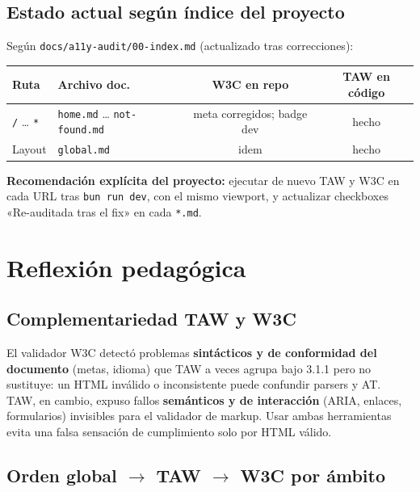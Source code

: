 \documentclass[11pt,a4paper]{article}
\begin{document}
\subsection{Estado actual según índice del proyecto}

Según \texttt{docs/a11y-audit/00-index.md} (actualizado tras correcciones):

\begin{center}
\small
\begin{tabular}{@{}llcc@{}}
\toprule
\textbf{Ruta} & \textbf{Archivo doc.} & \textbf{W3C en repo} & \textbf{TAW en código} \\
\midrule
\texttt{/} … \texttt{*} & \texttt{home.md} … \texttt{not-found.md} & meta corregidos; badge dev & hecho \\
Layout & \texttt{global.md} & idem & hecho \\
\bottomrule
\end{tabular}
\end{center}

\textbf{Recomendación explícita del proyecto:} ejecutar de nuevo TAW y W3C en cada URL tras \texttt{bun run dev}, con el mismo viewport, y actualizar checkboxes «Re-auditada tras el fix» en cada \texttt{*.md}.

\section{Reflexión pedagógica}

\subsection{Complementariedad TAW y W3C}

El validador W3C detectó problemas \textbf{sintácticos y de conformidad del documento} (metas, idioma) que TAW a veces agrupa bajo 3.1.1 pero no sustituye: un HTML inválido o inconsistente puede confundir parsers y AT. TAW, en cambio, expuso fallos \textbf{semánticos y de interacción} (ARIA, enlaces, formularios) invisibles para el validador de markup. Usar ambas herramientas evita una falsa sensación de cumplimiento solo por HTML válido.

\subsection{Orden global $\rightarrow$ TAW $\rightarrow$ W3C por ámbito}
\end{document}
